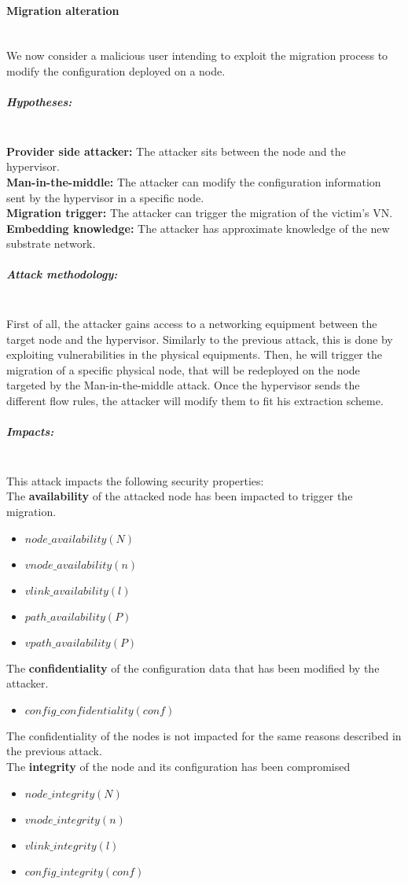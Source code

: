 \paragraph{Migration alteration}\textbf{\\}
We now consider a malicious user intending to exploit the migration process to modify the configuration deployed on a node.

\subparagraph{Hypotheses:}\textbf{\\}
\textbf{Provider side attacker:} The attacker sits between the node and the hypervisor.\\
\textbf{Man-in-the-middle:} The attacker can modify the configuration information sent by the hypervisor in a specific node.\\
\textbf{Migration trigger:} The attacker can trigger the migration of the victim's VN.\\
\textbf{Embedding knowledge:} The attacker has approximate knowledge of the new substrate network.

\subparagraph{Attack methodology:}\textbf{\\}
First of all, the attacker gains access to a networking equipment between the target node and the hypervisor. Similarly to the previous attack, this is done by exploiting vulnerabilities in the physical equipments.
Then, he will trigger the migration of a specific physical node, that will be redeployed on the node targeted by the Man-in-the-middle attack.
Once the hypervisor sends the different flow rules, the attacker will modify them to fit his extraction scheme.

\subparagraph{Impacts:}\textbf{\\}
This attack impacts the following security properties:\\
The \textbf{availability} of the attacked node has been impacted to trigger the migration.
\begin{itemize}
    \item $node\_availability(N)$
    \item $vnode\_availability(n)$
    \item $vlink\_availability(l)$
    \item $path\_availability(P)$
    \item $vpath\_availability(P)$
\end{itemize}
The \textbf{confidentiality} of the configuration data that has been modified by the attacker.
\begin{itemize}
    \item $config\_confidentiality(conf)$
\end{itemize}
The confidentiality of the nodes is not impacted for the same reasons described in the previous attack.\\
The \textbf{integrity} of the node and its configuration has been compromised
    \begin{itemize}
    \item $node\_integrity(N)$
    \item $vnode\_integrity(n)$
    \item $vlink\_integrity(l)$
    \item $config\_integrity(conf)$
\end{itemize}


